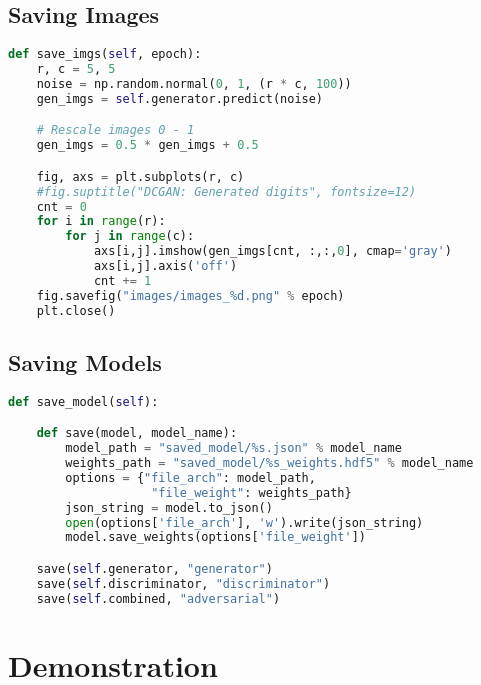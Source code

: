 \subsection{Saving Images} %
\label{subsec:save_imgs}
\begin{lstlisting}[basicstyle=\scriptsize,language=Python]
def save_imgs(self, epoch):
    r, c = 5, 5
    noise = np.random.normal(0, 1, (r * c, 100))
    gen_imgs = self.generator.predict(noise)

    # Rescale images 0 - 1
    gen_imgs = 0.5 * gen_imgs + 0.5

    fig, axs = plt.subplots(r, c)
    #fig.suptitle("DCGAN: Generated digits", fontsize=12)
    cnt = 0
    for i in range(r):
        for j in range(c):
            axs[i,j].imshow(gen_imgs[cnt, :,:,0], cmap='gray')
            axs[i,j].axis('off')
            cnt += 1
    fig.savefig("images/images_%d.png" % epoch)
    plt.close()
\end{lstlisting}

\subsection{Saving Models} %
\label{sub:saving_models}
\begin{lstlisting}[basicstyle=\scriptsize,language=Python]
def save_model(self):

    def save(model, model_name):
        model_path = "saved_model/%s.json" % model_name
        weights_path = "saved_model/%s_weights.hdf5" % model_name
        options = {"file_arch": model_path,
                    "file_weight": weights_path}
        json_string = model.to_json()
        open(options['file_arch'], 'w').write(json_string)
        model.save_weights(options['file_weight'])

    save(self.generator, "generator")
    save(self.discriminator, "discriminator")
    save(self.combined, "adversarial")
\end{lstlisting}



\section{Demonstration} %
\label{sec:demonstration}

